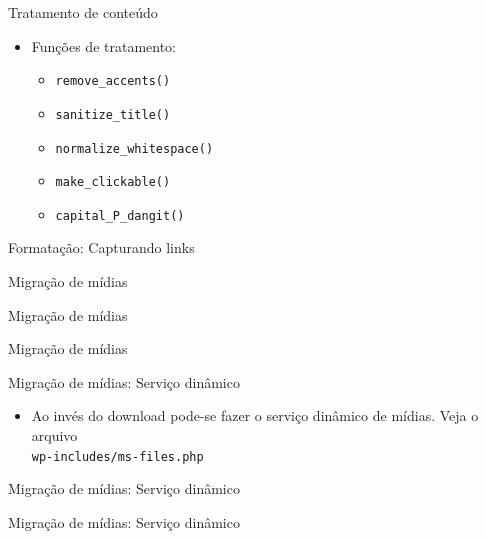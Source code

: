 \documentclass[handout]{beamer}
\begin{document}
\begin{frame}{Tratamento de conteúdo}
  \begin{itemize}
    \pause \item Funções de tratamento:
    \begin{itemize}
      \pause \item \texttt{remove\_accents()}
      \pause \item \texttt{sanitize\_title()}
      \pause \item \texttt{normalize\_whitespace()}
      \pause \item \texttt{make\_clickable()}
      \pause \item \texttt{capital\_P\_dangit()}
    \end{itemize}
  \end{itemize}
\end{frame}

\begin{frame}{Formatação: Capturando links}
  
\end{frame}

\begin{frame}{Migração de mídias}
  
\end{frame}

\begin{frame}{Migração de mídias}
  
\end{frame}

\begin{frame}{Migração de mídias}
  
\end{frame}

\begin{frame}{Migração de mídias: Serviço dinâmico}
  \begin{itemize}
    \item Ao invés do download pode-se fazer o serviço dinâmico de mídias.
          Veja o arquivo \\
          \texttt{wp-includes/ms-files.php}
  \end{itemize}
\end{frame}

\begin{frame}{Migração de mídias: Serviço dinâmico}
  
\end{frame}

\begin{frame}{Migração de mídias: Serviço dinâmico}
  
\end{frame}
\end{document}
